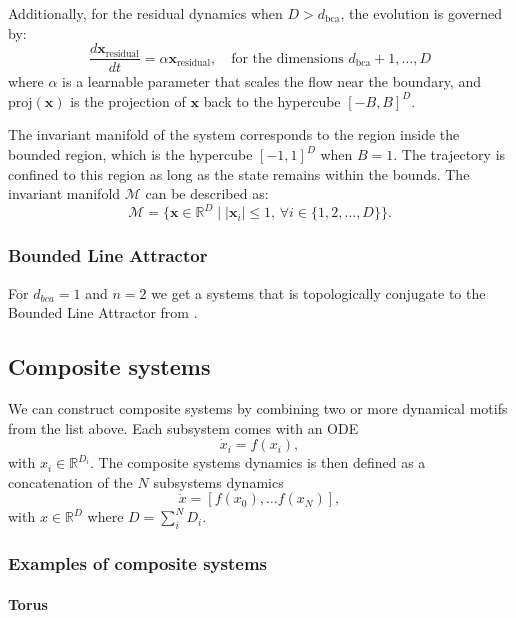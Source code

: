 \documentclass{article}
\theoremstyle{definition} \newtheorem{definition}{Definition}  \newtheorem{example}{Example}
\theoremstyle{remark} \newtheorem{remark}{Remark}
\newcounter{ct}
\newcommand{\field}[1]{\ensuremath{\mathbb{#1}}}
\newcommand{\reals}{\field{R}}
\begin{document}
Additionally, for the residual dynamics when \( D > d_{\text{bca}} \), the evolution is governed by:
\[
\frac{d \mathbf{x}_{\text{residual}}}{dt} = \alpha \mathbf{x}_{\text{residual}}, \quad \text{for the dimensions } d_{\text{bca}}+1, \dots, D
\]
where \( \alpha \) is a learnable parameter that scales the flow near the boundary, and \( \text{proj}(\mathbf{x}) \) is the projection of \( \mathbf{x} \) back to the hypercube \( [-B, B]^D \).


The invariant manifold of the system corresponds to the region inside the bounded region, which is the hypercube \( [-1, 1]^D \) when \( B = 1 \).
The trajectory is confined to this region as long as the state remains within the bounds.
The invariant manifold \( \mathcal{M} \) can be described as:
\[
\mathcal{M} = \{ \mathbf{x} \in \mathbb{R}^D \mid |\mathbf{x}_i| \leq 1, \, \forall i \in \{1, 2, \dots, D\} \}.
\]


\subsubsection{Bounded Line Attractor}
For $d_{bca}=1$ and $n=2$ we get a systems that is topologically conjugate to the Bounded Line Attractor from \citep{Sagodi2024a}.



\subsection{Composite systems}\label{sec:composite}
We can construct composite systems by combining two or more dynamical motifs from the list above.
Each subsystem comes with an ODE
\begin{equation}
\dot x_i = f(x_i),
\end{equation}
with $x_i\in \reals^{D_i}$.
The composite systems dynamics is then defined as a concatenation of the $N$ subsystems dynamics
\begin{equation}
\dot x = [f(x_0), \dots f(x_N)],
\end{equation}
with $x\in \reals^{D}$ where $D=\sum_i^N D_i$.


\subsubsection{Examples of composite systems}
\paragraph{Torus}
\end{document}
